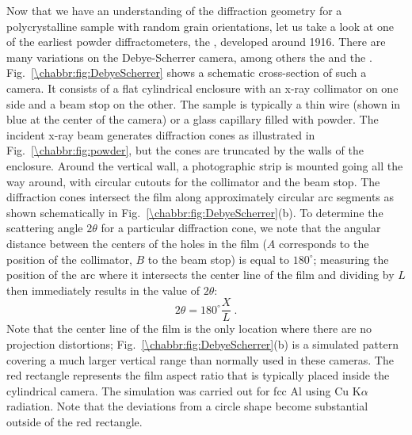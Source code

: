 Now that we have an understanding of the diffraction geometry for a polycrystalline sample with random grain orientations, let us take a look at one of the earliest powder diffractometers, the , developed around 1916. There are many variations on the Debye-Scherrer camera, among others the  and the . Fig.~\ref{\chabbr:fig:DebyeScherrer} shows a schematic cross-section of such a camera. It consists of a flat cylindrical enclosure with an x-ray collimator on one side and a beam stop on the other.  The sample is typically a thin wire (shown in blue at the center of the camera) or a glass capillary filled with powder. The incident x-ray beam generates diffraction cones as illustrated in Fig.~\ref{\chabbr:fig:powder}, but the cones are truncated by the walls of the enclosure. Around the vertical wall, a photographic strip is mounted going all the way around, with circular cutouts for the collimator and the beam stop. The diffraction cones intersect the film along approximately circular arc segments as shown schematically in Fig.~\ref{\chabbr:fig:DebyeScherrer}(b).  To determine the scattering angle $2\theta$ for a particular diffraction cone, we note that the angular distance between the centers of the holes in the film ($A$ corresponds to the position of the collimator, $B$ to the beam stop) is equal to $180^{\circ}$; measuring the position of the arc where it intersects the center line of the film and dividing by $L$ then immediately results in the value of $2\theta$:
\begin{equation}
	2\theta = 180^{\circ} \frac{X}{L}\ .
\end{equation}
Note that the center line of the film is the only location where there are no projection distortions; Fig.~\ref{\chabbr:fig:DebyeScherrer}(b) is a simulated pattern covering a much larger vertical range than normally used in these cameras. The red rectangle represents the film aspect ratio that is typically placed inside the cylindrical camera. The simulation was carried out for fcc Al using Cu K$\alpha$ radiation. Note that the deviations from a circle shape become substantial outside of the red rectangle. 




